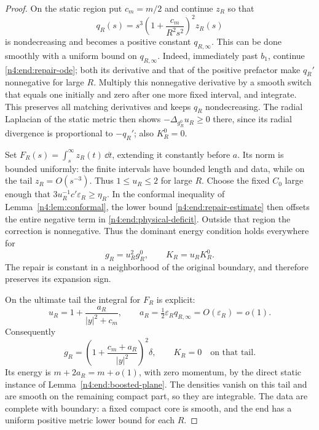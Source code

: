 \begin{proof}
On the static region put \(c_m=m/2\) and continue \(z_R\) so that
\[
 q_R(s)=s^3\left(1+\frac{c_m}{R^2s^2}\right)^2z_R(s)
\]
is nondecreasing and becomes a positive constant \(q_{R,\infty}\).
This can be done smoothly with a uniform bound on \(q_{R,\infty}\).
Indeed, immediately past \(b_1\), continue \eqref{n4:end:repair-ode};
both its derivative and that of the positive prefactor make \(q_R'\)
nonnegative for large \(R\). Multiply this nonnegative derivative by
a smooth switch that equals one initially and zero after one more fixed
interval, and integrate. This preserves all matching derivatives and
keeps \(q_R\) nondecreasing. The radial Laplacian of the static metric
then shows \(-\Delta_{g_R^0}u_R\ge0\) there, since its radial divergence
is proportional to \(-q_R'\); also \(K_R^0=0\).

Set \(F_R(s)=\int_s^\infty z_R(t)\,\dd t\), extending it constantly
before \(a\). Its norm is bounded uniformly: the finite intervals have
bounded length and data, while on the tail \(z_R=O(s^{-3})\).
Thus \(1\le u_R\le2\) for large \(R\).
Choose the fixed \(C_0\) large enough that
\(3u_R^{-1}c'\varepsilon_R\ge\eta_R\). In the conformal inequality of
Lemma~\ref{n4:lem:conformal}, the lower bound
\eqref{n4:end:repair-estimate} then offsets the entire negative term in
\eqref{n4:end:physical-deficit}. Outside that region the correction is
nonnegative. Thus the dominant energy condition holds everywhere for
\[
 g_R=u_R^2g_R^0,\qquad K_R=u_RK_R^0.
\]
The repair is constant in a neighborhood of the original boundary, and
therefore preserves its expansion sign.

On the ultimate tail the integral for \(F_R\) is explicit:
\[
 u_R=1+\frac{a_R}{|y|^2+c_m},\qquad
 a_R=\tfrac12\varepsilon_Rq_{R,\infty}=O(\varepsilon_R)=o(1).
\]
Consequently
\begin{equation}\label{n4:end:static-repaired-metric}
 g_R=\left(1+\frac{c_m+a_R}{|y|^2}\right)^2\delta,
 \qquad K_R=0
 \quad\text{on that tail}.
\end{equation}
Its energy is \(m+2a_R=m+o(1)\), with zero momentum, by the direct
static instance of Lemma~\ref{n4:end:boosted-plane}. The densities vanish
on this tail and are smooth on the remaining compact part, so they are
integrable. The data are complete with boundary: a fixed compact core
is smooth, and the end has a uniform positive metric lower bound for
each \(R\).


\end{proof}

